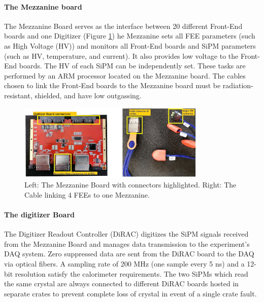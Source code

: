 \paragraph{The Mezzanine board}
The Mezzanine Board serves as the interface between 20 different 
Front-End boards and one Digitizer (Figure \ref{fig:mezzanine}) 
he Mezzanine sets all FEE parameters (such as High Voltage (HV)) and 
monitors all Front-End boards and SiPM parameters (such as HV, temperature, and current). 
It also provides low voltage to the Front-End boards. The HV of each SiPM can be 
independently set. These tasks are performed by an ARM processor located on the 
Mezzanine board. The cables chosen to link the Front-End boards to the 
Mezzanine board must be radiation-resistant, shielded, and have low outgassing. 
\begin{figure}[!h]
    \centering
    \includegraphics[width =0.8\textwidth]{figures/png/Screenshot_20240706_144234.png}
    \caption[The calorimeter Mezzanine Board and FEE.]{Left: The Mezzanine Board with connectors highlighted. 
    Right: The Cable linking 4 FEEs to one Mezzanine.}
    \label{fig:mezzanine}
\end{figure}



\paragraph{The digitizer Board}
The Digitizer Readout Controller (DiRAC) digitizes the SiPM 
signals received from the Mezzanine Board and manages data 
transmission to the experiment's DAQ system. Zero suppressed 
data are sent from the DiRAC board to the DAQ via optical fibers. 
A sampling rate of 200 MHz (one sample every 5 ns) and a 12-bit resolution 
satisfy the calorimeter requirements. The two SiPMs which read the same 
crystal are always connected to different DiRAC boards hosted in separate 
crates to prevent  complete loss of  crystal
in  event of a single crate fault.

